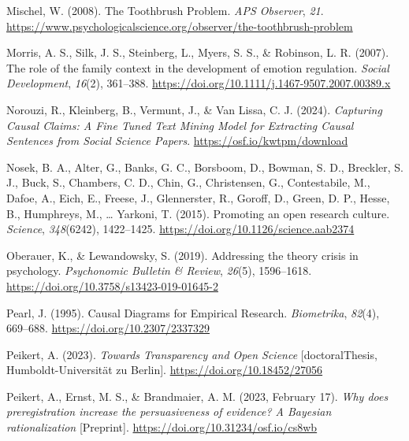 \documentclass[
  man, noextraspace,floatsintext]{apa7}
\newlength{\cslhangindent}
\newenvironment{CSLReferences}[2] %
 {\begin{list}{}{%
  \setlength{\itemindent}{0pt}
  \setlength{\leftmargin}{0pt}
  \setlength{\parsep}{0pt}
  \ifodd #1
   \setlength{\leftmargin}{\cslhangindent}
   \setlength{\itemindent}{-1\cslhangindent}
  \fi
  \setlength{\itemsep}{#2\baselineskip}}}
 {\end{list}}
\begin{document}
\begin{CSLReferences}{1}{0}
Mischel, W. (2008). The {Toothbrush Problem}. \emph{APS Observer}, \emph{21}. \url{https://www.psychologicalscience.org/observer/the-toothbrush-problem}

Morris, A. S., Silk, J. S., Steinberg, L., Myers, S. S., \& Robinson, L. R. (2007). The role of the family context in the development of emotion regulation. \emph{Social Development}, \emph{16}(2), 361--388. \url{https://doi.org/10.1111/j.1467-9507.2007.00389.x}

Norouzi, R., Kleinberg, B., Vermunt, J., \& Van Lissa, C. J. (2024). \emph{Capturing {Causal Claims}: {A Fine Tuned Text Mining Model} for {Extracting Causal Sentences} from {Social Science Papers}}. \url{https://osf.io/kwtpm/download}

Nosek, B. A., Alter, G., Banks, G. C., Borsboom, D., Bowman, S. D., Breckler, S. J., Buck, S., Chambers, C. D., Chin, G., Christensen, G., Contestabile, M., Dafoe, A., Eich, E., Freese, J., Glennerster, R., Goroff, D., Green, D. P., Hesse, B., Humphreys, M., \ldots{} Yarkoni, T. (2015). Promoting an open research culture. \emph{Science}, \emph{348}(6242), 1422--1425. \url{https://doi.org/10.1126/science.aab2374}

Oberauer, K., \& Lewandowsky, S. (2019). Addressing the theory crisis in psychology. \emph{Psychonomic Bulletin \& Review}, \emph{26}(5), 1596--1618. \url{https://doi.org/10.3758/s13423-019-01645-2}

Pearl, J. (1995). Causal {Diagrams} for {Empirical Research}. \emph{Biometrika}, \emph{82}(4), 669--688. \url{https://doi.org/10.2307/2337329}

Peikert, A. (2023). \emph{Towards {Transparency} and {Open Science}} {[}doctoralThesis, Humboldt-Universität zu Berlin{]}. \url{https://doi.org/10.18452/27056}

Peikert, A., Ernst, M. S., \& Brandmaier, A. M. (2023, February 17). \emph{Why does preregistration increase the persuasiveness of evidence? {A Bayesian} rationalization} {[}Preprint{]}. \url{https://doi.org/10.31234/osf.io/cs8wb}


\end{CSLReferences}
\end{document}
